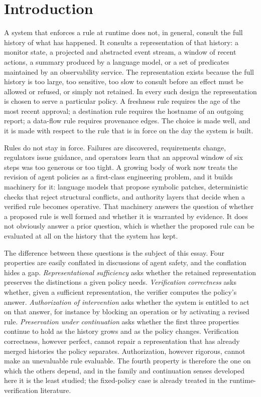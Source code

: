 \documentclass[11pt]{article}
\theoremstyle{definition}
\theoremstyle{remark}
\begin{document}
\section{Introduction}

A system that enforces a rule at runtime does not, in general, consult the full history of what has happened. It consults a representation of that history: a monitor state, a projected and abstracted event stream, a window of recent actions, a summary produced by a language model, or a set of predicates maintained by an observability service. The representation exists because the full history is too large, too sensitive, too slow to consult before an effect must be allowed or refused, or simply not retained. In every such design the representation is chosen to serve a particular policy. A freshness rule requires the age of the most recent approval; a destination rule requires the hostname of an outgoing report; a data-flow rule requires provenance edges. The choice is made well, and it is made with respect to the rule that is in force on the day the system is built.

Rules do not stay in force. Failures are discovered, requirements change, regulators issue guidance, and operators learn that an approval window of six steps was too generous or too tight. A growing body of work now treats the revision of agent policies as a first-class engineering problem, and it builds machinery for it: language models that propose symbolic patches, deterministic checks that reject structural conflicts, and authority layers that decide when a verified rule becomes operative. That machinery answers the question of whether a proposed rule is well formed and whether it is warranted by evidence. It does not obviously answer a prior question, which is whether the proposed rule can be evaluated at all on the history that the system has kept.

The difference between these questions is the subject of this essay. Four properties are easily conflated in discussions of agent safety, and the conflation hides a gap. \emph{Representational sufficiency} asks whether the retained representation preserves the distinctions a given policy needs. \emph{Verification correctness} asks whether, given a sufficient representation, the verifier computes the policy's answer. \emph{Authorization of intervention} asks whether the system is entitled to act on that answer, for instance by blocking an operation or by activating a revised rule. \emph{Preservation under continuation} asks whether the first three properties continue to hold as the history grows and as the policy changes. Verification correctness, however perfect, cannot repair a representation that has already merged histories the policy separates. Authorization, however rigorous, cannot make an unevaluable rule evaluable. The fourth property is therefore the one on which the others depend, and in the family and continuation senses developed here it is the least studied; the fixed-policy case is already treated in the runtime-verification literature.
\end{document}
